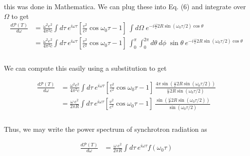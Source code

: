 \documentclass[]{article}
\begin{document}
\begin{enumerate}[a)]
this was done in Mathematica. We can plug these into Eq. (6) and integrate over $\Omega$ to get \\

\begin{equation}
\begin{aligned}
\frac{  d \mathscr{P} (T) }{ d\omega} & =  \frac{ \omega^2 e^2 }{ 4 \pi^2 c } \int d\tau \: e^{ i \omega \tau }  \left[ \frac{v^2}{c^2} \cos \omega_0 \tau - 1\right] \: \int d\Omega \; e^{  - i \frac{\omega}{c} 2R \sin( \omega_0 \tau / 2  ) \cos\theta  }    \\
%
 & =  \frac{ \omega^2 e^2 }{ 4 \pi^2 c } \int d\tau \: e^{ i \omega \tau }  \left[ \frac{v^2}{c^2} \cos \omega_0 \tau - 1\right] \:  \int_{0}^{\pi} \int_{0}^{2\pi} d\theta \: d\phi \; \sin\theta \:e^{  - i \frac{\omega}{c} 2R \sin( \omega_0 \tau / 2  ) \cos\theta  }    \\
\end{aligned}
\end{equation} \\

We can compute this easily using a substitution to get

\begin{equation}
\begin{aligned}
\frac{  d \mathscr{P} (T) }{ d\omega}  & =  \frac{ \omega^2e^2 }{ 4 \pi^2 c } \int d\tau \: e^{ i \omega \tau }  \left[ \frac{v^2}{c^2} \cos \omega_0 \tau - 1\right] \: \frac{ 4\pi \sin(  \frac{\omega}{c} 2R \sin( \omega_0 \tau / 2  )  )  }{  \frac{\omega}{c} 2R \sin( \omega_0 \tau / 2  ) }  \\
%
& =  \frac{ \omega \: e^2}{ 2 \pi R } \int d\tau \: e^{ i \omega \tau }  \left[ \frac{v^2}{c^2} \cos \omega_0 \tau - 1\right] \: \frac{ \sin(  \frac{\omega}{c} 2R \sin( \omega_0 \tau / 2  )  )  }{   \sin( \omega_0 \tau / 2  ) }  \\
\end{aligned}
\end{equation} \\

Thus, we may write the power spectrum of synchrotron radiation as

\begin{equation}
\begin{aligned}
\frac{  d \mathscr{P} (T) }{ d\omega}  & =  \frac{ \omega \: e^2}{ 2 \pi R } \int d\tau \: e^{ i \omega \tau } f \left(\omega_0 \tau \right)   \\
\end{aligned}
\end{equation} \\


\end{enumerate}
\end{document}
